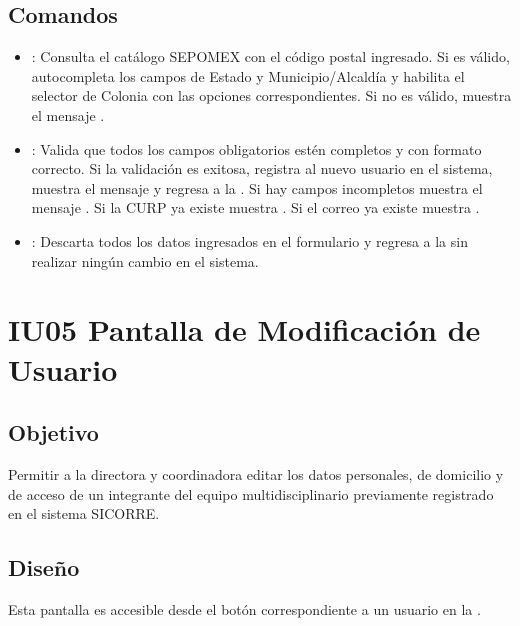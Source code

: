 \subsection{Comandos}
\begin{itemize}
	\item {}: Consulta el catálogo SEPOMEX con el 
	código postal ingresado. Si es válido, autocompleta los campos 
	de Estado y Municipio/Alcaldía y habilita el selector de Colonia 
	con las opciones correspondientes. Si no es válido, muestra el 
	mensaje .
	
	\item {}: Valida que todos los campos obligatorios 
	estén completos y con formato correcto. Si la validación es 
	exitosa, registra al nuevo usuario en el sistema, muestra el 
	mensaje  y regresa a la 
	. Si hay campos 
	incompletos muestra el mensaje 
	. Si la CURP ya 
	existe muestra . Si el correo 
	ya existe muestra .
	
	\item {}: Descarta todos los datos ingresados 
	en el formulario y regresa a la 
	 sin realizar 
	ningún cambio en el sistema.
\end{itemize}


\section{IU05 Pantalla de Modificación de Usuario}

\subsection{Objetivo}
Permitir a la directora y coordinadora editar los datos personales, 
de domicilio y de acceso de un integrante del equipo multidisciplinario 
previamente registrado en el sistema SICORRE.

\subsection{Diseño}
Esta pantalla  es 
accesible desde el botón  correspondiente a un 
usuario en la .

